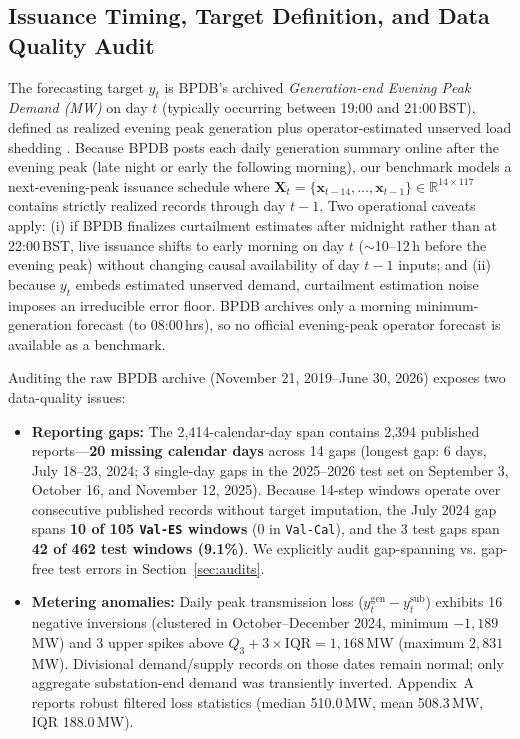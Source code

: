 \documentclass[5p,twocolumn,authoryear]{elsarticle}
\begin{document}
\subsection{Issuance Timing, Target Definition, and Data Quality Audit}
The forecasting target $y_t$ is BPDB's archived \textit{Generation-end Evening Peak Demand (MW)} on day $t$ (typically occurring between 19:00 and 21:00\,BST), defined as realized evening peak generation plus operator-estimated unserved load shedding \citep{bpdb2025annual}. Because BPDB posts each daily generation summary online after the evening peak (late night or early the following morning), our benchmark models a next-evening-peak issuance schedule where $\mathbf{X}_t = \{\mathbf{x}_{t-14}, \dots, \mathbf{x}_{t-1}\} \in \mathbb{R}^{14 \times 117}$ contains strictly realized records through day $t-1$. Two operational caveats apply: (i) if BPDB finalizes curtailment estimates after midnight rather than at 22:00\,BST, live issuance shifts to early morning on day $t$ ($\sim$10--12\,h before the evening peak) without changing causal availability of day $t-1$ inputs; and (ii) because $y_t$ embeds estimated unserved demand, curtailment estimation noise imposes an irreducible error floor. BPDB archives only a morning minimum-generation forecast (to 08:00\,hrs), so no official evening-peak operator forecast is available as a benchmark.

Auditing the raw BPDB archive (November 21, 2019--June 30, 2026) exposes two data-quality issues:
\begin{itemize}
    \item \textbf{Reporting gaps:} The 2,414-calendar-day span contains 2,394 published reports---\textbf{20 missing calendar days} across 14 gaps (longest gap: 6 days, July 18--23, 2024; 3 single-day gaps in the 2025--2026 test set on September 3, October 16, and November 12, 2025). Because 14-step windows operate over consecutive published records without target imputation, the July 2024 gap spans \textbf{10 of 105 \texttt{Val-ES} windows} (0 in \texttt{Val-Cal}), and the 3 test gaps span \textbf{42 of 462 test windows (9.1\%)}. We explicitly audit gap-spanning vs. gap-free test errors in Section~\ref{sec:audits}.
    \item \textbf{Metering anomalies:} Daily peak transmission loss ($y_t^{\text{gen}} - y_t^{\text{sub}}$) exhibits 16 negative inversions (clustered in October--December 2024, minimum $-1,189$\,MW) and 3 upper spikes above $Q_3 + 3\times\text{IQR} = 1,168$\,MW (maximum $2,831$\,MW). Divisional demand/supply records on those dates remain normal; only aggregate substation-end demand was transiently inverted. Appendix~A reports robust filtered loss statistics (median 510.0\,MW, mean 508.3\,MW, IQR 188.0\,MW).
\end{itemize}
\end{document}
